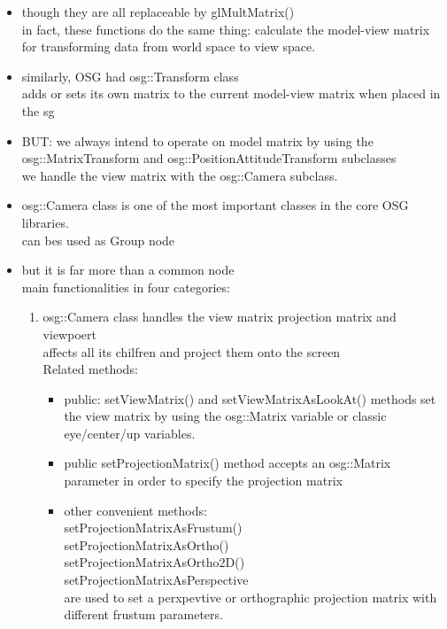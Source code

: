 \documentclass[a4paper,12pt]{book}
\begin{document}
\begin{itemize}
\item though they are all replaceable by glMultMatrix()\\
\textrightarrow in fact, these functions do the same thing: calculate the model-view matrix for transforming data from world space to view space.
\item similarly, OSG had osg::Transform class\\
\textrightarrow adds or sets its own matrix to the current model-view matrix when placed in the sg 
\item BUT: we always intend to operate on model matrix by using the\\
\textrightarrow osg::MatrixTransform and osg::PositionAttitudeTransform subclasses\\
\textrightarrow we handle the view matrix with the osg::Camera subclass.
\item osg::Camera class is one of the most important classes in the core OSG libraries.\\
\textrightarrow can bes used as Group node
\item but it is far more than a common node\\
\textrightarrow main functionalities in four categories:
\begin{enumerate}
\item osg::Camera class handles the view matrix projection matrix and viewpoert\\
\textrightarrow affects all its chilfren and project them onto the screen\\
Related methods:
\begin{itemize}
\item public: setViewMatrix() and setViewMatrixAsLookAt() methods set the view matrix by using the osg::Matrix variable or classic eye/center/up variables.
\item public setProjectionMatrix() method accepts an osg::Matrix parameter in order to specify the projection matrix
\item other convenient methods:\\
\textrightarrow setProjectionMatrixAsFrustum()\\
\textrightarrow setProjectionMatrixAsOrtho()\\
\textrightarrow setProjectionMatrixAsOrtho2D()\\
\textrightarrow setProjectionMatrixAsPerspective\\
are used to set a perxpevtive or orthographic projection matrix with different frustum parameters.\\

\end{itemize}
\end{enumerate}
\end{itemize}
\end{document}
